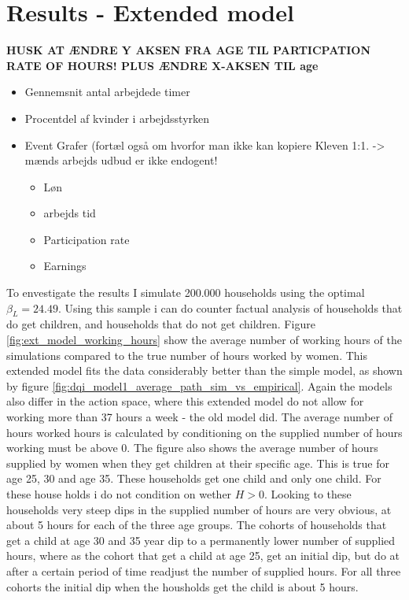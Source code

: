 \section{Results - Extended model}

\textbf{HUSK AT ÆNDRE Y AKSEN FRA AGE TIL PARTICPATION RATE OF HOURS! PLUS ÆNDRE X-AKSEN TIL age}

\begin{itemize}
    \item Gennemsnit antal arbejdede timer
    \item Procentdel af kvinder i arbejdsstyrken
    \item Event Grafer (fortæl også om hvorfor man ikke kan kopiere Kleven 1:1. -> mænds arbejds udbud er ikke endogent!
    \begin{itemize}
        \item Løn
        \item arbejds tid
        \item Participation rate
        \item Earnings
    \end{itemize}
\end{itemize}

To envestigate the results I simulate 200.000 households using the optimal $\beta_L = 24.49$. Using this sample i can do counter factual analysis of households that do get children, and households that do not get children. Figure \ref{fig:ext_model_working_hours} show the average number of working hours of the simulations compared to the true number of hours worked by women. This extended model fits the data considerably better than the simple model, as shown by figure \ref{fig:dqi_model1_average_path_sim_vs_empirical}. Again the models also differ in the action space, where this extended model do not allow for working more than 37 hours a week - the old model did. The average number of hours worked hours is calculated by conditioning on the supplied number of hours working must be above 0. The figure also shows the average number of hours supplied by women when they get children at their specific age. This is true for age 25, 30 and age 35. These households get one child and only one child. For these house holds i do not condition on wether $H>0$. Looking to these households very steep dips in the supplied number of hours are very obvious, at about 5 hours for each of the three age groups. The cohorts of households that get a child at age 30 and 35 year dip to a permanently lower number of supplied hours, where as the cohort that get a child at age 25, get an initial dip, but do at after a certain period of time readjust the number of supplied hours. For all three cohorts the initial dip when the housholds get the child is about 5 hours.

